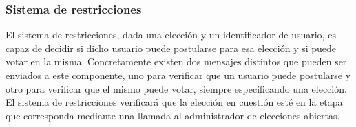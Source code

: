 \subsubsection{Sistema de restricciones}

El sistema de restricciones, dada una elección y un identificador de usuario, es capaz de decidir si dicho usuario puede postularse para esa elección y si puede votar en la misma. Concretamente existen dos mensajes distintos que pueden ser enviados a este componente, uno para verificar que un usuario puede postularse y otro para verificar que el mismo puede votar, siempre especificando una elección.
El sistema de restricciones verificará que la elección en cuestión esté en la etapa que corresponda mediante una llamada al administrador de elecciones abiertas.
